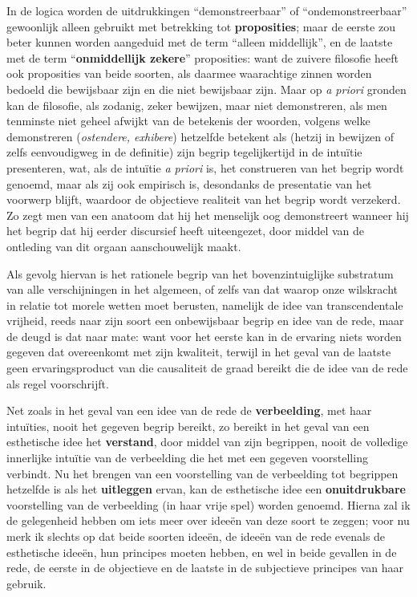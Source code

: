 In de logica worden de uitdrukkingen ``demonstreerbaar'' of ``ondemonstreerbaar'' gewoonlijk alleen gebruikt met betrekking tot \textbf{proposities}; maar de eerste zou beter kunnen worden aangeduid met de term ``alleen middellijk'', en de laatste met de term ``\textbf{onmiddellijk zekere}'' proposities: want de zuivere filosofie heeft ook proposities van beide soorten, als daarmee waarachtige zinnen worden bedoeld die bewijsbaar zijn en die niet bewijsbaar zijn. Maar op \textit{a priori} gronden kan de filosofie, als zodanig, zeker bewijzen, maar niet demonstreren, als men tenminste niet geheel afwijkt van de betekenis der woorden, volgens welke demonstreren (\textit{ostendere, exhibere}) hetzelfde betekent als (hetzij in bewijzen of zelfs eenvoudigweg in de definitie) zijn begrip tegelijkertijd in de intuïtie presenteren, wat, als de intuïtie \textit{a priori} is, het construeren van het begrip wordt genoemd, maar als zij ook empirisch is, desondanks de presentatie van het voorwerp blijft, waardoor de objectieve realiteit van het begrip wordt verzekerd. Zo zegt men van een anatoom dat hij het menselijk oog demonstreert wanneer hij het begrip dat hij eerder discursief heeft uiteengezet, door middel van de ontleding van dit orgaan aanschouwelijk maakt.

Als gevolg hiervan is het rationele begrip van het bovenzintuiglijke substratum van alle verschijningen in het algemeen, of zelfs van dat waarop onze wilskracht in relatie tot morele wetten moet berusten, namelijk de idee van transcendentale vrijheid, reeds naar zijn soort een onbewijsbaar begrip en idee van de rede, maar de deugd is dat naar mate: want voor het eerste kan in de ervaring niets worden gegeven dat overeenkomt met zijn kwaliteit, terwijl in het geval van de laatste geen ervaringsproduct van die causaliteit de graad bereikt die de idee van de rede als regel voorschrijft.

Net zoals in het geval van een idee van de rede de \textbf{verbeelding}, met haar intuïties, nooit het gegeven begrip bereikt, zo bereikt in het geval van een esthetische idee het \textbf{verstand}, door middel van zijn begrippen, nooit de volledige innerlijke intuïtie van de verbeelding die het met een gegeven voorstelling verbindt. Nu het brengen van een voorstelling van de verbeelding tot begrippen hetzelfde is als het \textbf{uitleggen} ervan, kan de esthetische idee een \textbf{onuitdrukbare} voorstelling van de verbeelding (in haar vrije spel) worden genoemd. Hierna zal ik de gelegenheid hebben om iets meer over ideeën van deze soort te zeggen; voor nu merk ik slechts op dat beide soorten ideeën, de ideeën van de rede evenals de esthetische ideeën, hun principes moeten hebben, en wel in beide gevallen in de rede, de eerste in de objectieve en de laatste in de subjectieve principes van haar gebruik.

